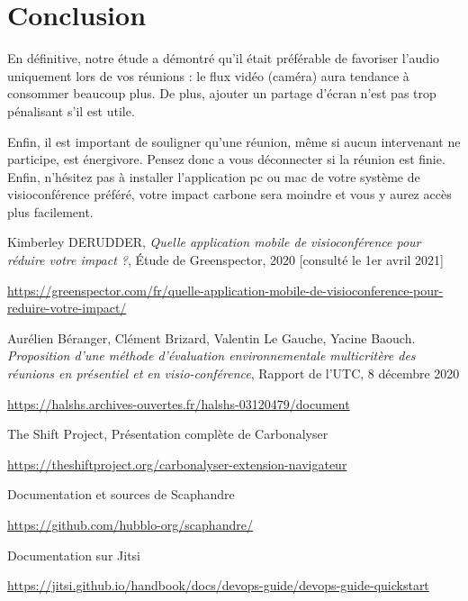 \documentclass[11pt,a4paper]{report}
\begin{document}
\chapter*{Conclusion}

En définitive, notre étude a démontré qu'il était préférable de favoriser l'audio uniquement lors de vos réunions : le flux vidéo (caméra) aura tendance à consommer beaucoup plus. De plus, ajouter un partage d'écran n'est pas trop pénalisant s'il est utile.

Enfin, il est important de souligner qu'une réunion, même si aucun intervenant ne participe, est énergivore. Pensez donc a vous déconnecter si la réunion est finie. Enfin, n'hésitez pas à installer l'application pc ou mac de votre système de visioconférence préféré, votre impact carbone sera moindre et vous y aurez accès plus facilement.


\begin{thebibliography}{9}
Kimberley DERUDDER, \textit{Quelle application mobile de visioconférence pour réduire votre impact ?}, Étude de Greenspector, 2020 [consulté le 1er avril 2021]

\url{https://greenspector.com/fr/quelle-application-mobile-de-visioconference-pour-reduire-votre-impact/}

Aurélien Béranger, Clément Brizard, Valentin Le Gauche, Yacine Baouch. \textit{Proposition d'une méthode d'évaluation environnementale multicritère des réunions en présentiel et en visio-conférence}, Rapport de l'UTC, 8 décembre 2020

\url{https://halshs.archives-ouvertes.fr/halshs-03120479/document}

The Shift Project, Présentation complète de Carbonalyser

\url{https://theshiftproject.org/carbonalyser-extension-navigateur}

Documentation et sources de Scaphandre

\url{https://github.com/hubblo-org/scaphandre/}

Documentation sur Jitsi

\url{https://jitsi.github.io/handbook/docs/devops-guide/devops-guide-quickstart}


\end{thebibliography}
\end{document}
